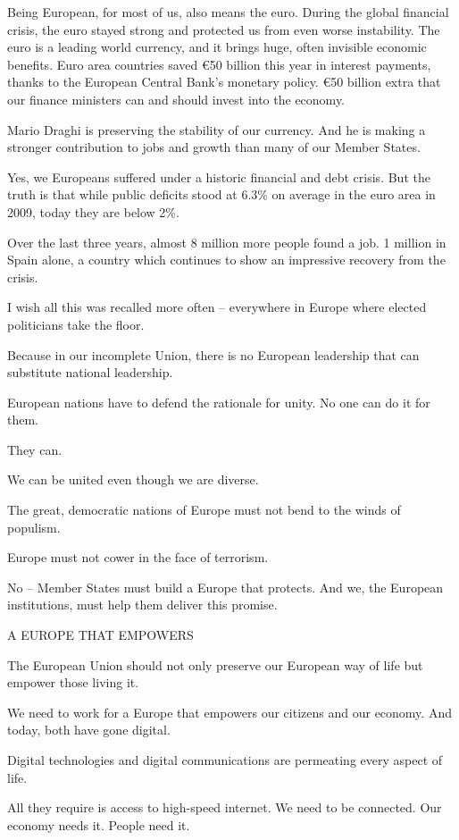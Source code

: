 \documentclass[a4paper,11pt]{article}
\begin{document}
Being European, for most of us, also means the euro. During the global financial crisis, the euro stayed strong and protected us from even worse instability. The euro is a leading world currency, and it brings huge, often invisible economic benefits. Euro area countries saved \euro50 billion this year in interest payments, thanks to the European Central Bank's monetary policy. \euro50 billion extra that our finance ministers can and should invest into the economy.

Mario Draghi is preserving the stability of our currency. And he is making a stronger contribution to jobs and growth than many of our Member States.

Yes, we Europeans suffered under a historic financial and debt crisis. But the truth is that while public deficits stood at 6.3\% on average in the euro area in 2009, today they are below 2\%.

Over the last three years, almost 8 million more people found a job. 1 million in Spain alone, a country which continues to show an impressive recovery from the crisis.

I wish all this was recalled more often – everywhere in Europe where elected politicians take the floor.

Because in our incomplete Union, there is no European leadership that can substitute national leadership.

European nations have to defend the rationale for unity. No one can do it for them.

They can.

We can be united even though we are diverse.

The great, democratic nations of Europe must not bend to the winds of populism.

Europe must not cower in the face of terrorism.

No – Member States must build a Europe that protects. And we, the European institutions, must help them deliver this promise.

 

A EUROPE THAT EMPOWERS

The European Union should not only preserve our European way of life but empower those living it.

We need to work for a Europe that empowers our citizens and our economy. And today, both have gone digital.

Digital technologies and digital communications are permeating every aspect of life.

All they require is access to high-speed internet. We need to be connected. Our economy needs it. People need it.
\end{document}
